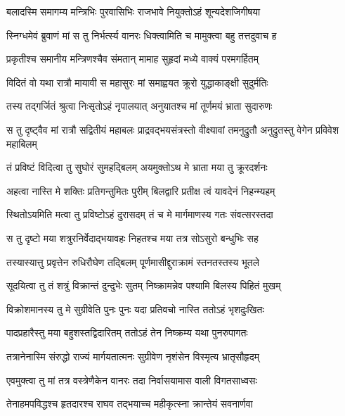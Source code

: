 \twolineshloka
{बलादस्मि समागम्य मन्त्रिभिः पुरवासिभिः}
{राजभावे नियुक्तोऽहं शून्यदेशजिगीषया} %

\twolineshloka
{स्निग्धमेवं ब्रुवाणं मां स तु निर्भर्त्स्य वानरः}
{धिक्त्वामिति च मामुक्त्वा बहु तत्तदुवाच ह} %

\twolineshloka
{प्रकृतीश्च समानीय मन्त्रिणश्चैव संमतान्}
{मामाह सुहृदां मध्ये वाक्यं परमगर्हितम्} %

\twolineshloka
{विदितं वो यथा रात्रौ मायावी स महासुरः}
{मां समाह्वयत क्रूरो युद्धाकाङ्क्षी सुदुर्मतिः} %

\twolineshloka
{तस्य तद्गर्जितं श्रुत्वा निःसृतोऽहं नृपालयात्}
{अनुयातश्च मां तूर्णमयं भ्राता सुदारुणः} %

\threelineshloka
{स तु दृष्ट्वैव मां रात्रौ सद्वितीयं महाबलः}
{प्राद्रवद्भयसंत्रस्तो वीक्ष्यावां तमनुद्रुतौ}
{अनुद्रुतस्तु वेगेन प्रविवेश महाबिलम्} %

\twolineshloka
{तं प्रविष्टं विदित्वा तु सुघोरं सुमहद्बिलम्}
{अयमुक्तोऽथ मे भ्राता मया तु क्रूरदर्शनः} %

\twolineshloka
{अहत्वा नास्ति मे शक्तिः प्रतिगन्तुमितः पुरीम्}
{बिलद्वारि प्रतीक्ष त्वं यावदेनं निहन्म्यहम्} %

\twolineshloka
{स्थितोऽयमिति मत्वा तु प्रविष्टोऽहं दुरासदम्}
{तं च मे मार्गमाणस्य गतः संवत्सरस्तदा} %

\twolineshloka
{स तु दृष्टो मया शत्रुरनिर्वेदाद्भयावहः}
{निहतश्च मया तत्र सोऽसुरो बन्धुभिः सह} %

\twolineshloka
{तस्यास्यात्तु प्रवृत्तेन रुधिरौघेण तद्बिलम्}
{पूर्णमासीद्दुराक्रामं स्तनतस्तस्य भूतले} %

\twolineshloka
{सूदयित्वा तु तं शत्रुं विक्रान्तं दुन्दुभेः सुतम्}
{निष्क्रामन्नेव पश्यामि बिलस्य पिहितं मुखम्} %

\twolineshloka
{विक्रोशमानस्य तु मे सुग्रीवेति पुनः पुनः}
{यदा प्रतिवचो नास्ति ततोऽहं भृशदुःखितः} %

\twolineshloka
{पादप्रहारैस्तु मया बहुशस्तद्विदारितम्}
{ततोऽहं तेन निष्क्रम्य यथा पुनरुपागतः} %

\twolineshloka
{तत्रानेनास्मि संरुद्धो राज्यं मार्गयतात्मनः}
{सुग्रीवेण नृशंसेन विस्मृत्य भ्रातृसौहृदम्} %

\twolineshloka
{एवमुक्त्वा तु मां तत्र वस्त्रेणैकेन वानरः}
{तदा निर्वासयामास वाली विगतसाध्वसः} %

\twolineshloka
{तेनाहमपविद्धश्च हृतदारश्च राघव}
{तद्भयाच्च महीकृत्स्ना क्रान्तेयं सवनार्णवा} %

